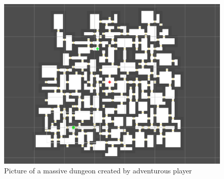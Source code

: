 \documentclass[conference,compsoc]{IEEEtran}
\begin{document}
\begin{figure}[h]
	\graphicspath{{figures/}}
	\includegraphics[width = \columnwidth ]{BigDungeon.png}
	\caption{Picture of a massive dungeon created by adventurous player}
	\label{fig:behavTree}
\end{figure}
\end{document}
